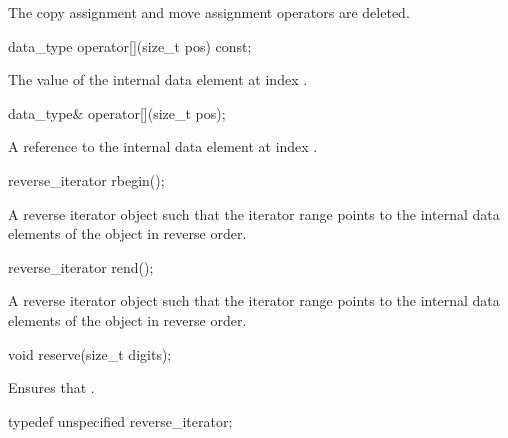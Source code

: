 \begin{addedblock}
\begin{itemdescr}
The copy assignment and move assignment operators are deleted.		
\end{itemdescr}

\begin{itemdecl}
data_type operator[](size_t pos) const;		
\end{itemdecl}

\begin{itemdescr}
\returns The value of the internal data element at index .		
\end{itemdescr}

\begin{itemdecl}
data_type& operator[](size_t pos);		
\end{itemdecl}

\begin{itemdescr}
\returns A reference to the internal data element at index .		
\end{itemdescr}

\begin{itemdecl}
reverse_iterator rbegin();		
\end{itemdecl}

\begin{itemdescr}
\returns A reverse iterator object such that the iterator range \tcode{[crbegin(), crend())} points to the internal data elements of the  object in reverse order.		
\end{itemdescr}

\begin{itemdecl}
reverse_iterator rend();		
\end{itemdecl}

\begin{itemdescr}
\returns A reverse iterator object such that the iterator range \tcode{[crbegin(), crend())} points to the internal data elements of the  object in reverse order.		
\end{itemdescr}

\begin{itemdecl}
void reserve(size_t digits);		
\end{itemdecl}

\begin{itemdescr}
\effects Ensures that .		
\end{itemdescr}

\begin{itemdecl}
typedef unspecified reverse_iterator;		
\end{itemdecl}


\end{addedblock}
